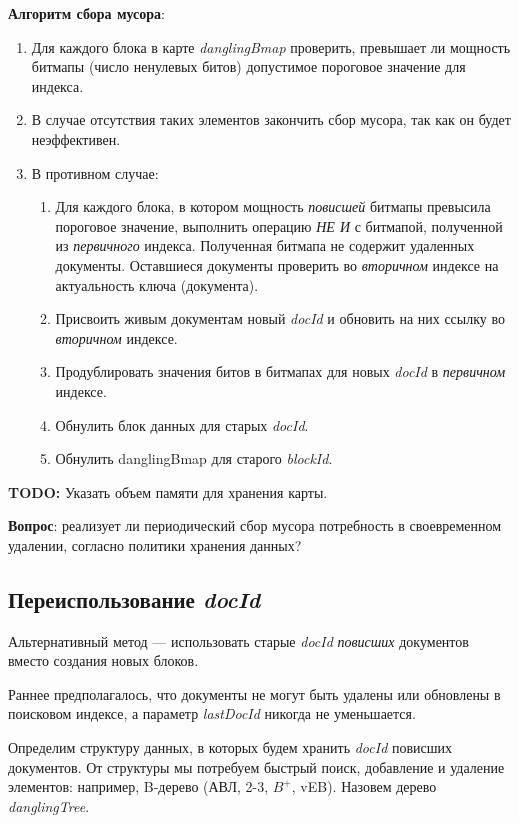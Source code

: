 \textbf{Алгоритм сбора мусора}:
\begin{enumerate}
    \item Для каждого блока в карте \textit{danglingBmap} проверить, превышает
    ли мощность битмапы (число ненулевых битов) допустимое пороговое значение
    для индекса.
    \item В случае отсутствия таких элементов закончить сбор мусора, так
    как он будет неэффективен.
    \item В противном случае: \begin{enumerate}
        \item Для каждого блока, в котором мощность \textit{повисшей} битмапы
        превысила пороговое значение, выполнить операцию \textit{НЕ И} с битмапой,
        полученной из \textit{первичного} индекса. Полученная битмапа не содержит
        удаленных документы. Оставшиеся документы проверить во \textit{вторичном}
        индексе на актуальность ключа (документа).
        \item Присвоить живым документам новый \textit{docId} и обновить
        на них ссылку во \textit{вторичном} индексе.
        \item Продублировать значения битов в битмапах для новых \textit{docId}
        в \textit{первичном} индексе.
        \item Обнулить блок данных для старых \textit{docId}.
        \item Обнулить danglingBmap для старого \textit{blockId}.
    \end{enumerate}
\end{enumerate}

\textbf{TODO:} Указать объем памяти для хранения карты.

\textbf{Вопрос}: реализует ли периодический сбор мусора потребность в своевременном удалении, согласно политики хранения данных?

\subsection{Переиспользование \textit{docId}}

Альтернативный метод — использовать старые \textit{docId} \textit{повисших}
документов вместо создания новых блоков.

Раннее предполагалось, что документы не могут быть удалены или обновлены в
поисковом индексе, а параметр \textit{lastDocId} никогда не уменьшается.

Определим структуру данных, в которых будем хранить \textit{docId} повисших
документов. От структуры мы потребуем быстрый поиск, добавление и удаление
элементов: например, B-дерево (АВЛ, 2-3, $B^{+}$, vEB).
Назовем дерево \textit{danglingTree}.

